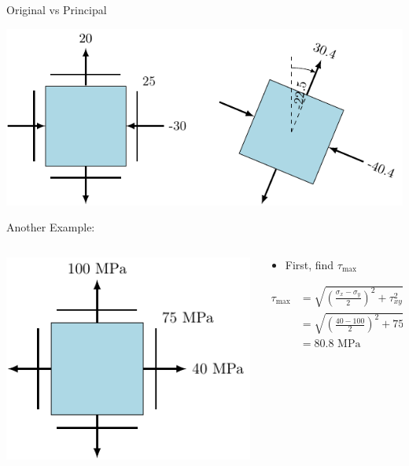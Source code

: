 \documentclass[10pt, svgnames]{beamer}
\begin{document}
\begin{frame}[label={sec:org23914ab}]{Original vs Principal}
\begin{center}
\includegraphics[width=.9\linewidth]{pictures/orig-vs-principal-I.pdf}
\end{center}
\end{frame}

\begin{frame}[label={sec:orgbb5f85b}]{Another Example:}
\begin{columns}
\begin{column}{0.4\columnwidth}
\begin{center}
\includegraphics[width=\textwidth]{pictures/example-II-prob.pdf}
\end{center}
\end{column}

\begin{column}{0.6\columnwidth}
\begin{itemize}
\item First, find \(\tau_{\max}\)
\end{itemize}

\begin{align*}
  \tau_{\max} &= \sqrt {\left( \frac{\sigma_x - \sigma_y}{2} \right)^2 + \tau _{xy}^2}  \\
              &= \sqrt {\left( \frac{40 - 100}{2} \right)^2 + 75^2}  \\
              &= 80.8 \text{ MPa}
\end{align*}
\end{column}
\end{columns}
\end{frame}
\end{document}
